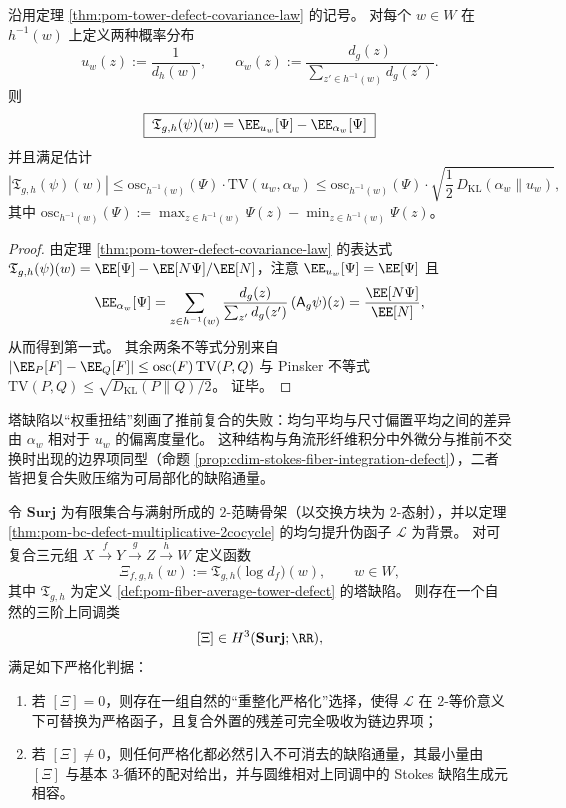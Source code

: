 \begin{corollary}\label{cor:pom-tower-defect-pinsker-bound}
沿用定理 \ref{thm:pom-tower-defect-covariance-law} 的记号。
对每个 \(w\in W\) 在 \(h^{-1}(w)\) 上定义两种概率分布
\[
u_w(z):=\frac1{d_h(w)},
\qquad
\alpha_w(z):=\frac{d_g(z)}{\sum_{z'\in h^{-1}(w)}d_g(z')}.
\]
则
\[
\boxed{\;
\mathfrak T_{g,h}(\psi)(w)=\EE_{u_w}[\Psi]-\EE_{\alpha_w}[\Psi]\;}
\]
并且满足估计
\[
|\mathfrak T_{g,h}(\psi)(w)|
\le \mathrm{osc}_{h^{-1}(w)}(\Psi)\cdot \mathrm{TV}(u_w,\alpha_w)
\le \mathrm{osc}_{h^{-1}(w)}(\Psi)\cdot \sqrt{\frac12\,D_{\mathrm{KL}}(\alpha_w\|u_w)},
\]
其中
\(
\mathrm{osc}_{h^{-1}(w)}(\Psi):=\max_{z\in h^{-1}(w)}\Psi(z)-\min_{z\in h^{-1}(w)}\Psi(z)
\)。
\end{corollary}
\begin{proof}
由定理 \ref{thm:pom-tower-defect-covariance-law} 的表达式
\(
\mathfrak T_{g,h}(\psi)(w)=\EE[\Psi]-\EE[N\Psi]/\EE[N]
\)，注意 \(\EE_{u_w}[\Psi]=\EE[\Psi]\) 且
\[
\EE_{\alpha_w}[\Psi]
=\sum_{z\in h^{-1}(w)}\frac{d_g(z)}{\sum_{z'}d_g(z')}\,(\mathsf A_g\psi)(z)
=\frac{\EE[N\Psi]}{\EE[N]},
\]
从而得到第一式。
其余两条不等式分别来自
\(
|\EE_P[F]-\EE_Q[F]|\le \mathrm{osc}(F)\,\mathrm{TV}(P,Q)
\)
与 Pinsker 不等式
\(
\mathrm{TV}(P,Q)\le \sqrt{D_{\mathrm{KL}}(P\|Q)/2}
\)。
证毕。
\end{proof}


\begin{remark}\label{rem:pom-tower-defect-stokes-analogy}
塔缺陷以“权重扭结”刻画了推前复合的失败：均匀平均与尺寸偏置平均之间的差异由 \(\alpha_w\) 相对于 \(u_w\) 的偏离度量化。
这种结构与角流形纤维积分中外微分与推前不交换时出现的边界项同型（命题 \ref{prop:cdim-stokes-fiber-integration-defect}），二者皆把复合失败压缩为可局部化的缺陷通量。
\end{remark}

\begin{conjecture}\label{conj:pom-third-obstruction-strictification}
令 \(\mathbf{Surj}\) 为有限集合与满射所成的 \(2\)-范畴骨架（以交换方块为 \(2\)-态射），并以定理 \ref{thm:pom-bc-defect-multiplicative-2cocycle} 的均匀提升伪函子 \(\mathcal L\) 为背景。
对可复合三元组
\(
X\xrightarrow{f}Y\xrightarrow{g}Z\xrightarrow{h}W
\)
定义函数
\[
\Xi_{f,g,h}(w):=\mathfrak T_{g,h}\bigl(\log d_f\bigr)(w),
\qquad w\in W,
\]
其中 \(\mathfrak T_{g,h}\) 为定义 \ref{def:pom-fiber-average-tower-defect} 的塔缺陷。
则存在一个自然的三阶上同调类
\[
[\Xi]\in H^3(\mathbf{Surj};\RR),
\]
满足如下严格化判据：
\begin{enumerate}
  \item 若 \([\Xi]=0\)，则存在一组自然的“重整化严格化”选择，使得 \(\mathcal L\) 在 \(2\)-等价意义下可替换为严格函子，且复合外置的残差可完全吸收为链边界项；
  \item 若 \([\Xi]\neq 0\)，则任何严格化都必然引入不可消去的缺陷通量，其最小量由 \([\Xi]\) 与基本 \(3\)-循环的配对给出，并与圆维相对上同调中的 Stokes 缺陷生成元相容。
\end{enumerate}
\end{conjecture}

\endinput
